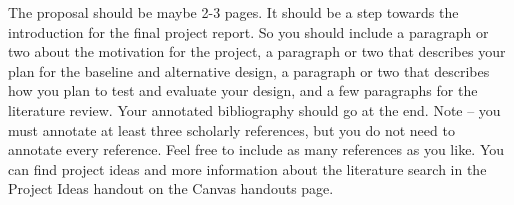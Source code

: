 \documentclass[10pt,letterpaper]{article}
\begin{document}
The proposal should be maybe 2-3 pages. It should be a step towards the
introduction for the final project report. So you should include a paragraph or
two about the motivation for the project, a paragraph or two that describes
your plan for the baseline and alternative design, a paragraph or two that
describes how you plan to test and evaluate your design, and a few paragraphs
for the literature review. Your annotated bibliography should go at the end.
Note -- you must annotate at least three scholarly references, but you do not
need to annotate every reference. Feel free to include as many references as
you like. You can find project ideas and more information about the literature
search in the Project Ideas handout on the Canvas handouts page.

\nocite{*}


\end{document}
